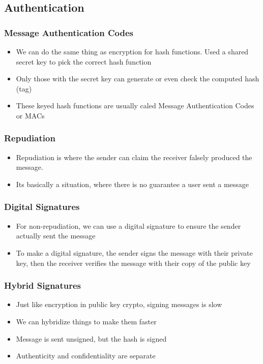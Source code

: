 \documentclass[twoside]{article}
\begin{document}
\subsection{Authentication}
\subsubsection{Message Authentication Codes}
\begin{itemize}
\item We can do the same thing as encryption for hash functions. Used a shared secret key to pick the correct hash function
\item Only those with the secret key can generate or even check the computed hash (tag)
\item These keyed hash functions are usually caled Message Authentication Codes or MACs
\end{itemize}

\subsubsection{Repudiation}
\begin{itemize}
\item Repudiation is where the sender can claim the receiver falsely produced the message. 
\item Its basically a situation, where there is no guarantee a user sent a message
\end{itemize}

\subsubsection{Digital Signatures}
\begin{itemize}
\item For non-repudiation, we can use a digital signature to ensure the sender actually sent the message
\item To make a digital signature, the sender signs the message with their private key, then the receiver verifies the message with their copy of the public key
\end{itemize}

\subsubsection{Hybrid Signatures}
\begin{itemize}
\item Just like encryption in public key crypto, signing messages is slow
\item We can hybridize things to make them faster 
\item Message is sent unsigned, but the hash is signed
\item Authenticity and confidentiality are separate
\end{itemize}
\end{document}
